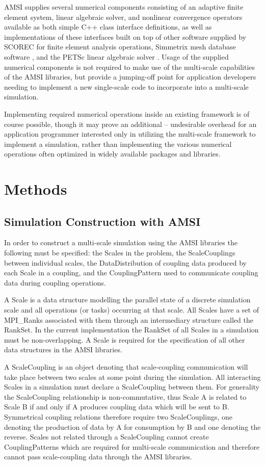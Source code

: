 \documentclass[11pt]{article}
\begin{document}
AMSI supplies several numerical components consisting of an adaptive finite element system, linear algebraic solver, and nonlinear convergence operators available as both simple C++ class interface definitions, as well as implementations of these interfaces built on top of other software supplied by SCOREC \cite{core} for finite element analysis operations, Simmetrix mesh database software \cite{simmetrix}, and the PETSc linear algebraic solver \cite{petsc-web-page} \cite{petsc-user-ref} \cite{petsc-efficient}.
Usage of the supplied numerical components is not required to make use of the multi-scale capabilities of the AMSI libraries, but provide a jumping-off point for application developers needing to implement a new single-scale code to incorporate into a multi-scale simulation.

Implementing required numerical operations inside an existing framework is of course possible, though it may prove an additional -- undesirable overhead for an application programmer interested only in utilizing the multi-scale framework to implement a simulation, rather than implementing the various numerical operations often optimized in widely available packages and libraries.

\section{Methods}\label{methods}

\subsection{Simulation Construction with AMSI}
In order to construct a multi-scale simulation using the AMSI libraries the following must be specified: the Scales in the problem, the ScaleCouplings between individual scales, the DataDistribution of coupling data produced by each Scale in a coupling, and the CouplingPattern used to communicate coupling data during coupling operations.

A Scale is a data structure modelling the parallel state of a discrete simulation scale and all operations (or tasks) occurring at that scale.
All Scales have a set of MPI\_Ranks associated with them through an intermediary structure called the RankSet.
In the current implementation the RankSet of all Scales in a simulation must be non-overlapping.
A Scale is required for the specification of all other data structures in the AMSI libraries.

A ScaleCoupling is an object denoting that scale-coupling communication will take place between two scales at some point during the simulation.
All interacting Scales in a simulation must declare a ScaleCoupling between them.
For generality the ScaleCoupling relationship is non-commutative, thus Scale A is related to Scale B if and only if A produces coupling data which will be sent to B.
Symmetrical coupling relations therefore require two ScaleCouplings, one denoting the production of data by A for consumption by B and one denoting the reverse.
Scales not related through a ScaleCoupling cannot create CouplingPatterns which are required for multi-scale communication and therefore cannot pass scale-coupling data through the AMSI libraries.
\end{document}
